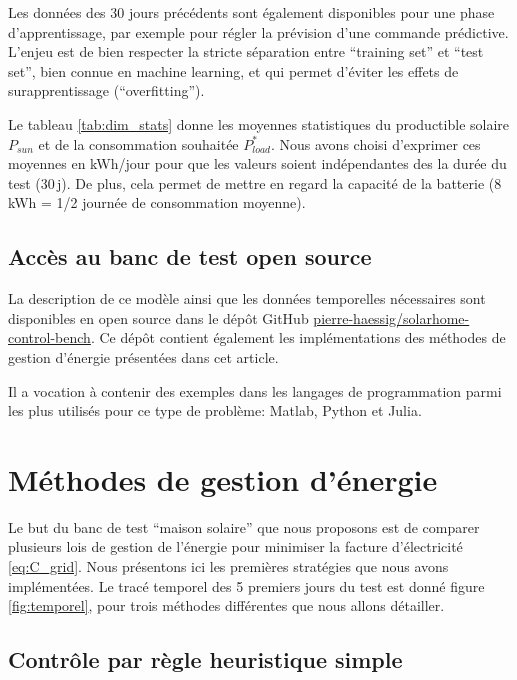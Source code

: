 \documentclass[a4paper,10pt,twocolumn]{article}
\begin{document}
Les données des 30 jours précédents sont également disponibles pour une phase d'apprentissage,
par exemple pour régler la prévision d'une commande prédictive.
L'enjeu est de bien respecter la stricte séparation entre ``training set''
et ``test set'', bien connue en machine learning, et qui permet d'éviter les effets de surapprentissage
(``overfitting'').

Le tableau \ref{tab:dim_stats} donne les moyennes statistiques du productible solaire $P_{sun}$
et de la consommation souhaitée $P_{load}^*$.
Nous avons choisi d'exprimer ces moyennes en kWh/jour pour que les valeurs soient indépendantes
des la durée du test (30\,j). De plus, cela permet de mettre en regard la capacité de la batterie
(8 kWh = 1/2 journée de consommation moyenne).


\subsection{Accès au banc de test open source}

La description de ce modèle ainsi que les données temporelles nécessaires sont
disponibles en open source dans le dépôt GitHub \href{https://github.com/pierre-haessig/solarhome-control-bench}{pierre-haessig/solarhome-control-bench}.
Ce dépôt contient également les implémentations des méthodes de gestion d'énergie présentées dans cet article.

Il a vocation à contenir des exemples dans les langages de programmation
parmi les plus utilisés pour ce type de problème:
Matlab, Python et Julia.

\section{Méthodes de gestion d'énergie}
\label{s:opt_meth}

Le but du banc de test ``maison solaire'' que nous proposons est de comparer
plusieurs lois de gestion de l'énergie pour minimiser la facture d'électricité \eqref{eq:C_grid}.
Nous présentons ici les premières stratégies que nous avons implémentées.
Le tracé temporel des 5 premiers jours du test est donné
figure \ref{fig:temporel}, pour trois méthodes différentes
que nous allons détailler.

\subsection{Contrôle par règle heuristique simple}
\label{ss:heuris}
\end{document}
